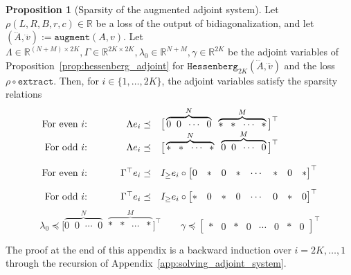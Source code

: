 \documentclass[a4paper,12pt]{article}
\theoremstyle{definition}
\newtheorem{proposition}{Proposition}
\begin{document}
\begin{proposition}[Sparsity of the augmented adjoint system]\label{prop:sparsity}
    Let $\rho(L, R, B, r, c) \in \mathbb{R}$ be a loss of the output of bidiagonalization, and let $(\dddot{A}, \dddot{v}) := \texttt{augment}(A, v)$. Let $\Lambda \in \mathbb{R}^{(N+M) \times 2K}, \Gamma \in \mathbb{R}^{2K \times 2K}, \lambda_0 \in \mathbb{R}^{N+M}, \gamma \in \mathbb{R}^{2K}$ be the adjoint variables of Proposition~\ref{prop:hessenberg_adjoint} for $\texttt{Hessenberg}_{2K}(\dddot{A}, \dddot{v})$ and the loss $\rho \circ \texttt{extract}$. Then, for $i \in \{1, \dots, 2K\}$, the adjoint variables satisfy the sparsity relations
    $$\begin{array}{rrl}
        \text{For even $i$: }& \quad\quad \Lambda e_i \preceq& \big[\overbrace{0 \;\; 0 \;\; \cdots \;\; 0}^{N} \;\; \overbrace{* \;\; * \;\; \cdots \;\; *}^{M}\big] ^\top
        \\
        \text{For odd $i$: }& \quad\quad \Lambda e_i \preceq& \big[\overbrace{* \;\; * \;\; \cdots \;\; *}^{N} \; \;\overbrace{0 \;\; 0 \;\; \cdots \;\; 0}^{M}\big]^\top 
        \\
        \\
        \text{For even $i$: }& \quad\quad \Gamma^\top e_i \preceq& I_{\geq}e_i \circ \begin{bmatrix} 0 & * & 0 & * & \cdots & * & 0 & *\end{bmatrix} ^\top \vspace{10px}
        \\
        \text{For odd $i$: }&  \quad \quad \Gamma^\top e_i \preceq& I_{\geq}e_i \circ \begin{bmatrix} * & 0 & * & 0 &  \cdots & 0 & * & 0\end{bmatrix} ^\top
    \end{array}$$
    $$\lambda_0 \preceq \big[\overbrace{0 \;\; 0 \;\; \cdots \;\; 0}^{N} \;\; \overbrace{* \;\; * \;\; \cdots \;\; *}^{M}\big] ^\top \quad \quad \gamma \preceq \begin{bmatrix} * & 0 & * & 0 & \cdots & 0 & * & 0 \end{bmatrix}^\top$$
\end{proposition}
The proof at the end of this appendix is a backward induction over $i = 2K, \dots, 1$ through the recursion of Appendix~\ref{app:solving_adjoint_system}.
\end{document}
